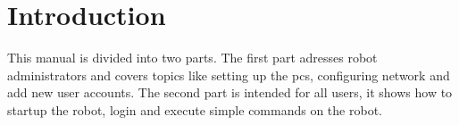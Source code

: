 \chapter{Introduction}   

This manual is divided into two parts. The first part adresses robot administrators and covers topics like setting up the pcs, configuring network and add new user accounts. The second part is intended for all users, it shows how to startup the robot, login and execute simple commands on the robot.


